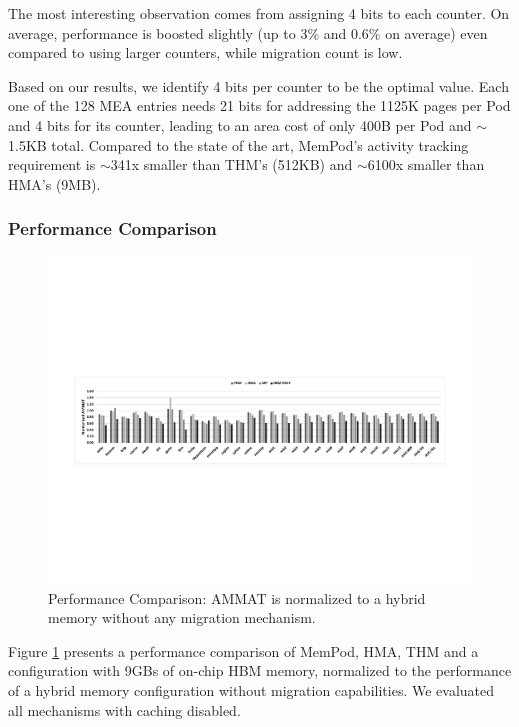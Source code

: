 The most interesting observation comes from assigning 4 bits to each counter. On average, performance is boosted slightly (up to 3\% and 0.6\% on average) even compared to using larger counters, while migration count is low. %

Based on our results, we identify 4 bits per counter to be the optimal value. Each one of the 128 MEA entries needs 21 bits for addressing the 1125K pages per Pod and 4 bits for its counter, leading to an area cost of only 400B per Pod and $\sim$1.5KB total. Compared to the state of the art, MemPod's activity tracking requirement is $\sim$341x smaller than THM's (512KB) and $\sim$6100x smaller than HMA's (9MB).

\subsubsection{Performance Comparison}
\label{sub:performance}

\begin{figure}[t]
  \includegraphics[width=\textwidth]{figures/performance_over_nlm.pdf}
  \caption{Performance Comparison: AMMAT is normalized to a hybrid memory without any migration mechanism.}
  \label{fig:performance}
\end{figure}

Figure \ref{fig:performance} presents a performance comparison of MemPod, HMA, THM and a configuration with 9GBs of on-chip HBM memory, normalized to the performance of a hybrid memory configuration without migration capabilities. We evaluated all mechanisms with caching disabled. 

